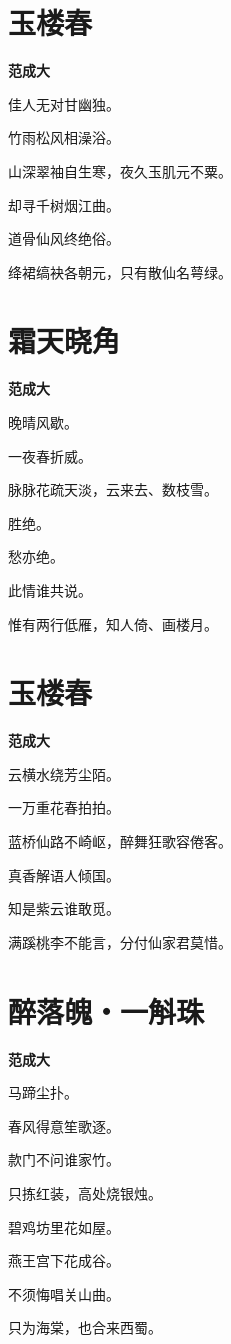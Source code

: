 \documentclass[12pt,a4paper]{ctexbook}
\begin{document}
\section{玉楼春}
\textbf{范成大}\par\vspace{0.5em}
佳人无对甘幽独。\par
竹雨松风相澡浴。\par
山深翠袖自生寒，夜久玉肌元不粟。\par
却寻千树烟江曲。\par
道骨仙风终绝俗。\par
绛裙缟袂各朝元，只有散仙名萼绿。\par

\section{霜天晓角}
\textbf{范成大}\par\vspace{0.5em}
晚晴风歇。\par
一夜春折威。\par
脉脉花疏天淡，云来去、数枝雪。\par
胜绝。\par
愁亦绝。\par
此情谁共说。\par
惟有两行低雁，知人倚、画楼月。\par

\section{玉楼春}
\textbf{范成大}\par\vspace{0.5em}
云横水绕芳尘陌。\par
一万重花春拍拍。\par
蓝桥仙路不崎岖，醉舞狂歌容倦客。\par
真香解语人倾国。\par
知是紫云谁敢觅。\par
满蹊桃李不能言，分付仙家君莫惜。\par

\section{醉落魄・一斛珠}
\textbf{范成大}\par\vspace{0.5em}
马蹄尘扑。\par
春风得意笙歌逐。\par
款门不问谁家竹。\par
只拣红装，高处烧银烛。\par
碧鸡坊里花如屋。\par
燕王宫下花成谷。\par
不须悔唱关山曲。\par
只为海棠，也合来西蜀。\par
\end{document}
